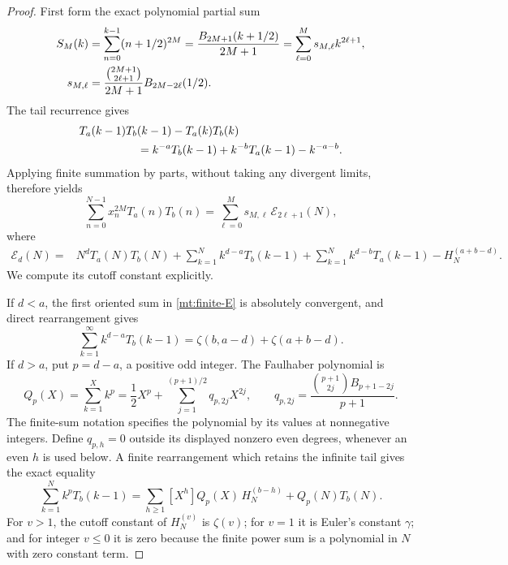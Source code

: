 \documentclass[11pt,letterpaper]{article}
\numberwithin{equation}{section}
\theoremstyle{plain}
\theoremstyle{definition}
\theoremstyle{remark}
\begin{document}
\begin{proof}
First form the exact polynomial partial sum
\begin{align}
 S_M(k)&=\sum_{n=0}^{k-1}(n+1/2)^{2M}
       =\frac{B_{2M+1}(k+1/2)}{2M+1}
       =\sum_{\ell=0}^{M}s_{M,\ell}k^{2\ell+1},
 \label{mt:S}\\
 s_{M,\ell}&=\frac{\binom{2M+1}{2\ell+1}}{2M+1}
                         B_{2M-2\ell}(1/2).
 \notag
\end{align}
The tail recurrence gives
\begin{align*}
&T_a(k-1)T_b(k-1)-T_a(k)T_b(k)\\
&\hspace{18mm}=k^{-a}T_b(k-1)+k^{-b}T_a(k-1)-k^{-a-b}.
\end{align*}
Applying finite summation by parts, without taking any divergent limits,
therefore yields
\begin{equation}\label{mt:finite-sbp}
 \sum_{n=0}^{N-1}x_n^{2M}T_a(n)T_b(n)
 =\sum_{\ell=0}^{M}s_{M,\ell}\,\mathcal E_{2\ell+1}(N),
\end{equation}
where
\begin{align}
 \mathcal E_d(N)={}&N^dT_a(N)T_b(N)
   +\sum_{k=1}^N k^{d-a}T_b(k-1)
   +\sum_{k=1}^N k^{d-b}T_a(k-1)
   -H_N^{(a+b-d)}.
 \label{mt:finite-E}
\end{align}
We compute its cutoff constant explicitly.

If $d<a$, the first oriented sum in \eqref{mt:finite-E} is absolutely
convergent, and direct rearrangement gives
\begin{equation}\label{mt:convergent-oriented}
 \sum_{k=1}^{\infty}k^{d-a}T_b(k-1)
 =\zeta(b,a-d)+\zeta(a+b-d).
\end{equation}
If $d>a$, put $p=d-a$, a positive odd integer. The Faulhaber
polynomial is
\begin{equation}\label{mt:faulhaber}
 Q_p(X)=\sum_{k=1}^X k^p
   =\frac12X^p+\sum_{j=1}^{(p+1)/2}q_{p,2j}X^{2j},
 \qquad
 q_{p,2j}=\frac{\binom{p+1}{2j}B_{p+1-2j}}{p+1}.
\end{equation}
The finite-sum notation specifies the polynomial by its values at
nonnegative integers. Define $q_{p,h}=0$ outside its displayed
nonzero even degrees, whenever an even $h$ is used below. A finite
rearrangement which retains the infinite tail gives the exact equality
\begin{equation}\label{mt:finite-rearrangement}
 \sum_{k=1}^N k^pT_b(k-1)
  =\sum_{h\ge1}[X^h]Q_p(X)\,H_N^{(b-h)}
    +Q_p(N)T_b(N).
\end{equation}
For $v>1$, the cutoff constant of $H_N^{(v)}$ is $\zeta(v)$;
for $v=1$ it is Euler's constant $\gamma$; and for integer $v\le0$
it is zero because the finite power sum is a polynomial in $N$ with
zero constant term.


\end{proof}
\end{document}
